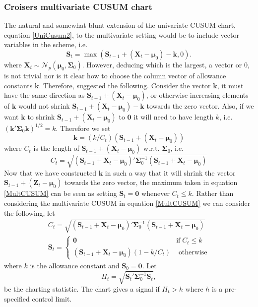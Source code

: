 \subsubsection{Croisers multivariate CUSUM chart}\label{croiserCUSUM}
The natural and somewhat blunt extension of the univariate CUSUM chart, equation \eqref{UniCusum2}, to the multivariate setting would be to include vector variables in the scheme, i.e. 
\begin{equation}\label{MultCUSUM}
\mathbf{S}_t=\max(\mathbf{S}_{t-1}+(\mathbf{X}_t-\boldsymbol{\mu}_0)-\mathbf{k},0).
\end{equation}
where $\mathbf{X}_t\sim\mathcal{N}_p(\boldsymbol{\mu}_0, \boldsymbol{\Sigma}_0)$. However, deducing which is the largest, a vector or 0, is not trivial nor is it clear how to choose the column vector of allowance constants $\mathbf{k}$. Therefore, \citet{Croiser1988} suggested the following. Consider the vector $\mathbf{k}$, it must have the same direction as $\mathbf{S}_{t-1}+(\mathbf{X}_t-\boldsymbol{\mu}_0)$, or otherwise increasing elements of $\mathbf{k}$ would not shrink $\mathbf{S}_{t-1}+(\mathbf{X}_t-\boldsymbol{\mu}_0)-\mathbf{k}$ towards the zero vector. Also, if we want $\mathbf{k}$ to shrink $\mathbf{S}_{t-1}+(\mathbf{X}_t-\boldsymbol{\mu}_0)$ to $\mathbf{0}$ it will need to have length $k$, i.e. $(\mathbf{k}'\boldsymbol{\Sigma}_0\mathbf{k})^{1/2}=k$. Therefore we set
$$
\mathbf{k}=(k/C_t)(\mathbf{S}_{t-1}+(\mathbf{X}_t-\boldsymbol{\mu}_0))
$$
where $C_t$ is the length of $\mathbf{S}_{t-1}+(\mathbf{X}_t-\boldsymbol{\mu}_0)$ w.r.t. $\boldsymbol{\Sigma}_0$, i.e.
$$
C_t=\sqrt{(\mathbf{S}_{t-1}+\mathbf{X}_t-\boldsymbol{\mu}_0)'\boldsymbol{\Sigma}^{-1}_0(\mathbf{S}_{t-1}+\mathbf{X}_t-\boldsymbol{\mu}_0)
}$$
Now that we have constructed $\mathbf{k}$ in such a way that it will shrink the vector $\mathbf{S}_{t-1}+(\mathbf{Z}_t-\boldsymbol{\mu}_0)$ towards the zero vector, the maximum taken in equation \ref{MultCUSUM} can be seen as setting $\mathbf{S}_t=\mathbf{0}$ whenever $C_t\leq k$. Rather than considering the multivariate CUSUM in equation \eqref{MultCUSUM} we can consider the following, let
\begin{align}
&C_t=\sqrt{(\mathbf{S}_{t-1}+\mathbf{X}_t-\boldsymbol{\mu}_0)'\boldsymbol{\Sigma}^{-1}_0
(\mathbf{S}_{t-1}+\mathbf{X}_t-\boldsymbol{\mu}_0)}\label{MCUSUM} &\\ 
&\mathbf{S}_t=\begin{cases}
\mathbf{0} & \text{if} \; C_t \leq k \\
(\mathbf{S}_{t-1}+\mathbf{X}_t-\boldsymbol{\mu}_0)(1-k/C_t) & \text{ otherwise}
\end{cases} \label{MCUSUM2} &
\end{align}
where $k$ is the allowance constant and $\mathbf{S}_0=\mathbf{0}$. Let 
\begin{equation}\label{Ht}
H_t=\sqrt{\mathbf{S}_t'\boldsymbol{\Sigma}^{-1}_0 \mathbf{S}_t},
\end{equation} 
be the charting statistic. The chart gives a signal if $H_t>h$ where $h$ is a pre-specified control limit. 

